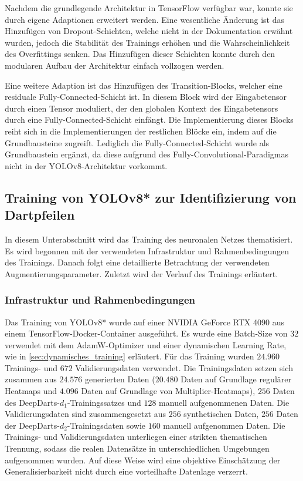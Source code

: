 Nachdem die grundlegende Architektur in TensorFlow verfügbar war, konnte sie durch eigene Adaptionen erweitert werden. Eine wesentliche Änderung ist das Hinzufügen von Dropout-Schichten, welche nicht in der Dokumentation erwähnt wurden, jedoch die Stabilität des Trainings erhöhen und die Wahrscheinlichkeit des Overfittings senken. Das Hinzufügen dieser Schichten konnte durch den modularen Aufbau der Architektur einfach vollzogen werden.

Eine weitere Adaption ist das Hinzufügen des Transition-Blocks, welcher eine residuale Fully-Connected-Schicht ist. In diesem Block wird der Eingabetensor durch einen Tensor moduliert, der den globalen Kontext des Eingabetensors durch eine Fully-Connected-Schicht einfängt. Die Implementierung dieses Blocks reiht sich in die Implementierungen der restlichen Blöcke ein, indem auf die Grundbausteine zugreift. Lediglich die Fully-Connected-Schicht wurde als Grundbaustein ergänzt, da diese aufgrund des Fully-Convolutional-Paradigmas nicht in der YOLOv8-Architektur vorkommt.


\subsection{Training von YOLOv8* zur Identifizierung von Dartpfeilen}
\label{sec:training}

In diesem Unterabschnitt wird das Training des neuronalen Netzes thematisiert. Es wird begonnen mit der verwendeten Infrastruktur und Rahmenbedingungen des Trainings. Danach folgt eine detaillierte Betrachtung der verwendeten Augmentierungsparameter. Zuletzt wird der Verlauf des Trainings erläutert.

\subsubsection{Infrastruktur und Rahmenbedingungen}

Das Training von YOLOv8* wurde auf einer NVIDIA GeForce RTX 4090 aus einem TensorFlow-Docker-Container ausgeführt. Es wurde eine Batch-Size von $32$ verwendet mit dem AdamW-Optimizer und einer dynamischen Learning Rate, wie in \autoref{sec:dynamisches_training} erläutert. Für das Training wurden $24.960$ Trainings- und $672$ Validierungsdaten verwendet. Die Trainingsdaten setzen sich zusammen aus $24.576$ generierten Daten ($20.480$ Daten auf Grundlage regulärer Heatmaps und $4.096$ Daten auf Grundlage von Multiplier-Heatmaps), $256$ Daten des DeepDarts-$d_1$-Trainingssatzes und $128$ manuell aufgenommenen Daten. Die Validierungsdaten sind zusammengesetzt aus $256$ synthetischen Daten, $256$ Daten der DeepDarts-$d_2$-Trainingsdaten sowie $160$ manuell aufgenommen Daten. Die Trainings- und Validierungsdaten unterliegen einer strikten thematischen Trennung, sodass die realen Datensätze in unterschiedlichen Umgebungen aufgenommen wurden. Auf diese Weise wird eine objektive Einschätzung der Generalisierbarkeit nicht durch eine vorteilhafte Datenlage verzerrt.

